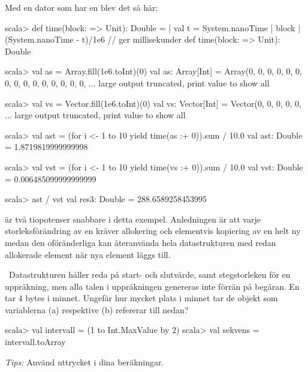 \SubtaskSolved Med en dator som har en  blev det så här:
\begin{REPL}
scala> def time(block: => Unit): Double =
     |   val t = System.nanoTime
     |   block
     |   (System.nanoTime - t)/1e6  // ger millisekunder
def time(block: => Unit): Double

scala> val as = Array.fill(1e6.toInt)(0)
val as: Array[Int] = Array(0, 0, 0, 0, 0, 0, 0, 0, 0, 0, 0, 0, 0, 0, 0, ...
large output truncated, print value to show all

scala> val vs = Vector.fill(1e6.toInt)(0)
val vs: Vector[Int] = Vector(0, 0, 0, 0, 0, ...
large output truncated, print value to show all

scala> val ast = (for i <- 1 to 10 yield time(as :+ 0)).sum / 10.0
val ast: Double = 1.8719819999999998

scala> val vst = (for i <- 1 to 10 yield time(vs :+ 0)).sum / 10.0
val vst: Double = 0.006485099999999999

scala> ast / vst
val res3: Double = 288.6589258453995

\end{REPL}

\SubtaskSolved {} är två tiopotenser snabbare i detta exempel. Anledningen är att varje storleksförändring av en  kräver allokering och elementvis kopiering av en helt ny  medan den oföränderliga  kan återanvända hela datastrukturen med redan allokerade element när nya element läggs till.

\QUESTEND





\QUESTBEGIN

\Task\Uberkurs \what~Datastrukturen  håller reda på start- och slutvärde, samt stegstorleken för en uppräkning, men alla talen i uppräkningen genereras inte förrän på begäran. En  tar 4 bytes i minnet. Ungefär hur mycket plats i minnet tar de objekt som variablerna (a)  respektive (b)  refererar till nedan?

\begin{REPL}
scala> val intervall = (1 to Int.MaxValue by 2)
scala> val sekvens = intervall.toArray
\end{REPL}
\emph{Tips:} Använd uttrycket  i dina beräkningar.


\SOLUTION

\TaskSolved  \what~

